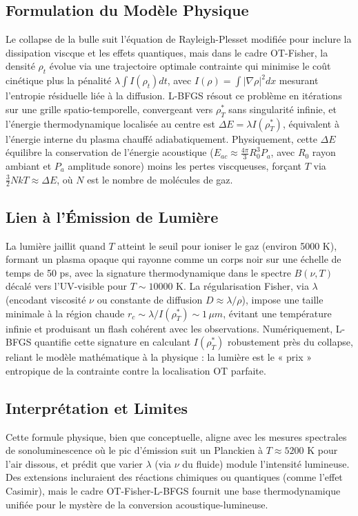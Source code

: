 \documentclass[a4paper,12pt]{article}
\begin{document}
\subsection{Formulation du Modèle Physique}
Le collapse de la bulle suit l'équation de Rayleigh-Plesset modifiée pour inclure la dissipation viscque et les effets quantiques, mais dans le cadre OT-Fisher, la densité \( \rho_t \) évolue via une trajectoire optimale contrainte qui minimise le coût cinétique plus la pénalité \( \lambda \int I(\rho_t) dt \), avec \( I(\rho) = \int \vert \nabla \rho \vert^2 dx \) mesurant l'entropie résiduelle liée à la diffusion. L-BFGS résout ce problème en itérations sur une grille spatio-temporelle, convergeant vers \( \rho_T^* \) sans singularité infinie, et l'énergie thermodynamique localisée au centre est \( \Delta E = \lambda I(\rho_T^*) \), équivalent à l'énergie interne du plasma chauffé adiabatiquement. Physiquement, cette \( \Delta E \) équilibre la conservation de l'énergie acoustique (\( E_{ac} \approx \frac{4 \pi}{3} R_0^3 P_a \), avec \( R_0 \) rayon ambiant et \( P_a \) amplitude sonore) moins les pertes viscqueuses, forçant \( T \) via \( \frac{3}{2} N k T \approx \Delta E \), où \( N \) est le nombre de molécules de gaz.
\subsection{Lien à l'Émission de Lumière}
La lumière jaillit quand \( T \) atteint le seuil pour ioniser le gaz (environ 5000 K), formant un plasma opaque qui rayonne comme un corps noir sur une échelle de temps de 50 ps, avec la signature thermodynamique dans le spectre \( B(\nu, T) \) décalé vers l'UV-visible pour \( T \sim 10000 \) K. La régularisation Fisher, via \( \lambda \) (encodant viscosité \( \nu \) ou constante de diffusion \( D \approx \lambda / \rho \)), impose une taille minimale à la région chaude \( r_c \sim \lambda / I(\rho_T^*) \sim 1 \, \mu m \), évitant une température infinie et produisant un flash cohérent avec les observations. Numériquement, L-BFGS quantifie cette signature en calculant \( I(\rho_T^*) \) robustement près du collapse, reliant le modèle mathématique à la physique : la lumière est le « prix » entropique de la contrainte contre la localisation OT parfaite.
\subsection{Interprétation et Limites}
Cette formule physique, bien que conceptuelle, aligne avec les mesures spectrales de sonoluminescence où le pic d'émission suit un Planckien à \( T \approx 5200 \) K pour l'air dissous, et prédit que varier \( \lambda \) (via \( \nu \) du fluide) module l'intensité lumineuse. Des extensions incluraient des réactions chimiques ou quantiques (comme l'effet Casimir), mais le cadre OT-Fisher-L-BFGS fournit une base thermodynamique unifiée pour le mystère de la conversion acoustique-lumineuse.
\newpage
\end{document}
